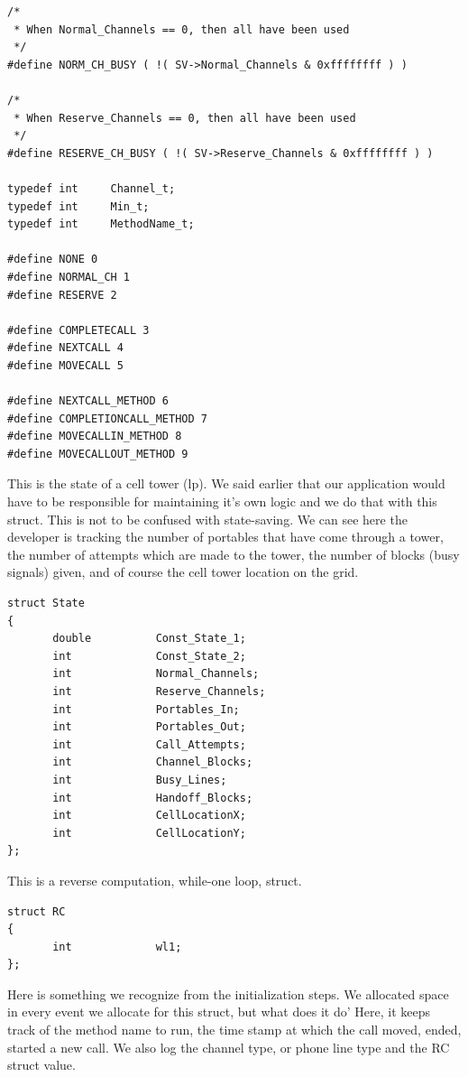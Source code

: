\documentclass[12pt]{article}
\begin{document}
\begin{verbatim}
/*
 * When Normal_Channels == 0, then all have been used
 */
#define NORM_CH_BUSY ( !( SV->Normal_Channels & 0xffffffff ) )

/*
 * When Reserve_Channels == 0, then all have been used
 */
#define RESERVE_CH_BUSY ( !( SV->Reserve_Channels & 0xffffffff ) )

typedef int     Channel_t;
typedef int     Min_t;
typedef int     MethodName_t;

#define NONE 0
#define NORMAL_CH 1
#define RESERVE 2

#define COMPLETECALL 3
#define NEXTCALL 4
#define MOVECALL 5

#define NEXTCALL_METHOD 6
#define COMPLETIONCALL_METHOD 7
#define MOVECALLIN_METHOD 8
#define MOVECALLOUT_METHOD 9
\end{verbatim}

This is the state of a cell tower (lp).  We said earlier that our
application would have to be responsible for maintaining it's own
logic and we do that with this struct.  This is not to be confused
with state-saving.  We can see here the developer is tracking the
number of portables that have come through a tower, the number of
attempts which are made to the tower, the number of blocks (busy
signals) given, and of course the cell tower location on the grid.

\begin{verbatim}                                                                                     
struct State
{
       double          Const_State_1;
       int             Const_State_2;
       int             Normal_Channels;
       int             Reserve_Channels;
       int             Portables_In;
       int             Portables_Out;
       int             Call_Attempts;
       int             Channel_Blocks;
       int             Busy_Lines;
       int             Handoff_Blocks;
       int             CellLocationX;
       int             CellLocationY;
};
\end{verbatim}
 
This is a reverse computation, while-one loop, struct.

\begin{verbatim}
struct RC
{
       int             wl1;
};
\end{verbatim}
 
Here is something we recognize from the initialization steps.  We
allocated space in every event we allocate for this struct, but what
does it do' Here, it keeps track of the method name to run, the time
stamp at which the call moved, ended, started a new call.  We also log
the channel type, or phone line type and the RC struct value.
\end{document}
